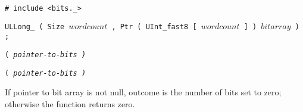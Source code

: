 
\tt{# include <bits._>}

\tt{ULLong_} \s\tt{( Size} $wordcount$
\tt{, Ptr ( UInt_fast8 [} $wordcount$ \tt{] )} $bitarray$ \tt{) ;}

\s\tt{(}
\it{pointer-to-bits} \tt{)}

\s\s\tt{(}
\it{pointer-to-bits} \tt{)}


If pointer to bit array is not null, outcome is the number of bits set to zero;
otherwise the function returns zero.
